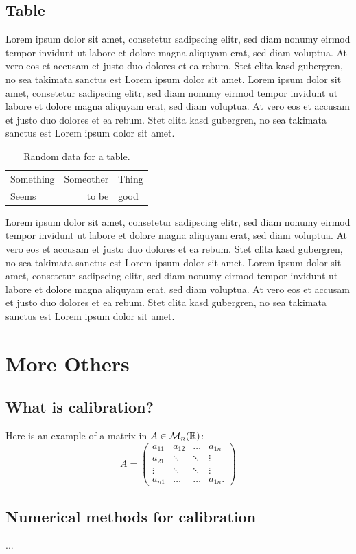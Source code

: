 \subsection{Table}
Lorem ipsum dolor sit amet, consetetur sadipscing elitr, sed diam nonumy eirmod tempor invidunt ut labore et dolore magna aliquyam erat, sed diam voluptua. At vero eos et accusam et justo duo dolores et ea rebum. Stet clita kasd gubergren, no sea takimata sanctus est Lorem ipsum dolor sit amet. Lorem ipsum dolor sit amet, consetetur sadipscing elitr, sed diam nonumy eirmod tempor invidunt ut labore et dolore magna aliquyam erat, sed diam voluptua. At vero eos et accusam et justo duo dolores et ea rebum. Stet clita kasd gubergren, no sea takimata sanctus est Lorem ipsum dolor sit amet.
\begin{table}[!ht]
	\centering
	\begin{tabular}{|l|rl|}
		\hline
		Something & Someother & Thing \\
  		Seems & to be & good\\
  		\hline
  	\end{tabular}
  	\caption{Random data for a table.}
\end{table}

Lorem ipsum dolor sit amet, consetetur sadipscing elitr, sed diam nonumy eirmod tempor invidunt ut labore et dolore magna aliquyam erat, sed diam voluptua. At vero eos et accusam et justo duo dolores et ea rebum. Stet clita kasd gubergren, no sea takimata sanctus est Lorem ipsum dolor sit amet. Lorem ipsum dolor sit amet, consetetur sadipscing elitr, sed diam nonumy eirmod tempor invidunt ut labore et dolore magna aliquyam erat, sed diam voluptua. At vero eos et accusam et justo duo dolores et ea rebum. Stet clita kasd gubergren, no sea takimata sanctus est Lorem ipsum dolor sit amet.


\section{More Others}
\subsection{What is calibration?}
Here is an example of a matrix\cite{website:fermentas-lambda} in $A\in\mathcal{M}_n(\mathbb{R})$:
$$
A = 
\begin{pmatrix}
a_{11} & a_{12} & \ldots & a_{1n}\\
a_{21} & \ddots & \ddots  & \vdots\\
\vdots &  \ddots & \ddots  & \vdots\\
a_{n1} &  \ldots &  \ldots & a_{1n}.
\end{pmatrix}
$$

\subsection{Numerical methods for calibration}
...



